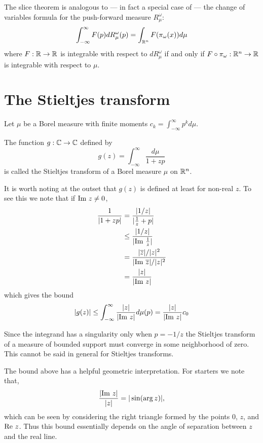 \begin{remark}
  The slice theorem is analogous to — in fact a special case of — the change of variables formula for the push-forward measure $R^\omega_\mu$:
  \[
    \int_{-\infty}^\infty F(p) dR^\omega_\mu(p) = \int_{\mathbb{R}^n} F(\pi_\omega(x)) d\mu
  \]
  where $F:\mathbb{R} \rightarrow \mathbb{R}$ is integrable with respect to $dR^\omega_\mu$ if and only if $F\circ\pi_\omega : \mathbb{R}^n \rightarrow \mathbb{R}$ is integrable with respect to $\mu$.
\end{remark}








\section{The Stieltjes transform}\label{sec:stieltjes}

Let $\mu$ be a Borel measure with finite moments $c_k = \int_{-\infty}^\infty p^k d\mu$. 

\begin{definition}
  The function $g : \mathbb{C} \to \mathbb{C}$ defined by
  \[
    g(z) = \int_{-\infty}^\infty\frac{d\mu}{1+zp}
  \]
  is called the Stieltjes transform of a Borel measure $\mu$ on $\mathbb{R}^n$.
\end{definition}

It is worth noting at the outset that $g(z)$ is defined at least for non-real $z$. To see this we note that if $\text{Im}~ z \neq 0$,
\begin{align*}
  \frac1{|1 + zp|} 
  &= \frac{|1/z|}{|\frac1z + p|} \\
  &\leq \frac{|1/z|}{|\text{Im}~ \frac1z|} \\
  &= \frac{|\overline{z}|/|z|^2}{|\text{Im}~ \overline{z}|/|z|^2} \\
  &= \frac{|z|}{|\text{Im}~ z|}
\end{align*}
which gives the bound
\begin{equation}
  |g(z)| 
  \leq \int_{-\infty}^\infty \frac{|z|}{|\text{Im}~ z|} d\mu(p) 
  = \frac{|z|}{|\text{Im}~ z|}c_0
\end{equation}

Since the integrand has a singularity only when $p = -1/z$ the Stieltjes transform of a measure of bounded support must converge in some neighborhood of zero. This cannot be said in general for Stieltjes transforms. 

\begin{remark}
  The bound above has a helpful geometric interpretation. For starters we note that,
  \[
    \frac{|\text{Im}~ z|}{|z|} = |\sin(\arg z)|,
  \]
  which can be seen by considering the right triangle formed by the points $0$, $z$, and $\text{Re}~ z$. Thus this bound essentially depends on the angle of separation between $z$ and the real line. 
\end{remark}

